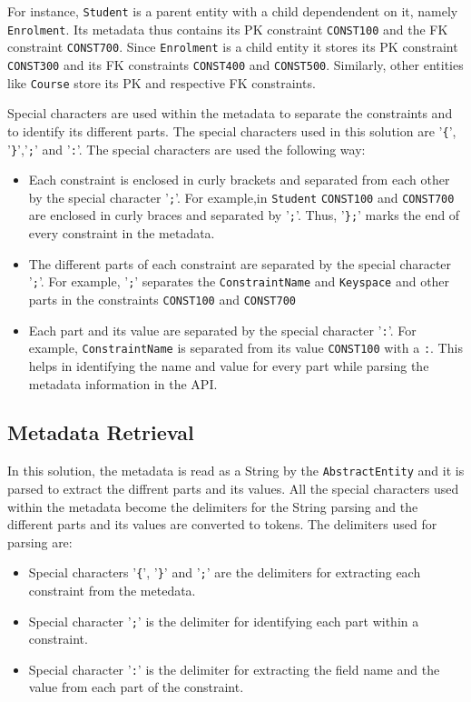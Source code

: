 	For instance, \texttt{Student}  is a parent entity with a child dependendent on
	it, namely \texttt{Enrolment}. 
	Its metadata thus contains its \ac{PK} constraint \texttt{CONST100} and the
	\ac{FK} constraint \texttt{CONST700}. Since
	\texttt{Enrolment} is a child entity it  stores its \ac{PK} constraint
	\texttt{CONST300} and its \ac{FK} constraints \texttt{CONST400} and
	\texttt{CONST500}. Similarly, other entities like \texttt{Course} store its
	\ac{PK} and respective \ac{FK} constraints.
	
	Special characters are used within the metadata to separate the constraints and
	to identify its different parts. The special characters used in this solution
	are '\texttt{\{}', '\texttt{\}}','\texttt{;}' and '\texttt{:}'. The special
	characters are used the following way:
	
	\begin{itemize}
	\item Each constraint is enclosed in curly brackets and separated from each
	other by the special character '\texttt{;}'. For example,in \texttt{Student}
	\texttt{CONST100} and \texttt{CONST700} are enclosed in curly braces and
	separated by '\texttt{;}'. Thus, '\texttt{\};}' marks the end of every
	constraint in the metadata.


	\item The different parts of each constraint are separated by the special character
	'\texttt{;}'. For example,  '\texttt{;}' separates the \texttt{ConstraintName}
	 and \texttt{Keyspace} and other parts in the constraints \texttt{CONST100} and
	 \texttt{CONST700}
	 
	 
	\item Each part and its value are separated by the special character
	'\texttt{:}'. For example, \texttt{ConstraintName} is separated from
	its value \texttt{CONST100} with a \texttt{:}. This helps in identifying the
	name and value for every part while parsing the metadata information
	in the \ac{API}.
	
	\end{itemize}
	
\subsection{Metadata Retrieval}
	In this solution, the metadata is read as a String by the
	\texttt{AbstractEntity} and it is parsed to extract the diffrent parts and its
	values. All the special characters used within the metadata become the
	delimiters for the String parsing and  the different parts and
	its values are converted to tokens. 
	The delimiters used for parsing are:
		\begin{itemize}
		  \item Special characters '\texttt{\{}', '\texttt{\}}' and '\texttt{;}' are
		  the delimiters for extracting each constraint from the metedata.
		  \item Special character '\texttt{;}' is the delimiter for identifying each
		  part within a constraint.
		  \item Special character '\texttt{:}' is the delimiter for extracting the
		  field name and the value from each part of the constraint.
		\end{itemize}
		
